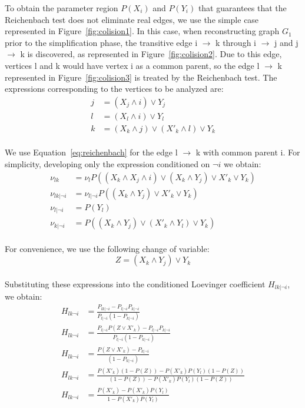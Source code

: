 \documentclass[12pt,a4paper]{report}
\begin{document}
To obtain the parameter region $P(X_i)$ and $P(Y_i)$ that guarantees that the Reichenbach test does not eliminate real edges, we use the simple case represented in Figure~\ref{fig:colision1}. In this case, when reconstructing graph $G_1$ prior to the simplification phase, the transitive edge i $ \rightarrow $ k through i $ \rightarrow $ j and j $ \rightarrow $ k is discovered, as represented in Figure~\ref{fig:colision2}. Due to this edge, vertices l and k would have vertex i as a common parent, so the edge l $ \rightarrow $ k represented in Figure~\ref{fig:colision3} is treated by the Reichenbach test. The expressions corresponding to the vertices to be analyzed are:
\begin{align*}
j &= (X_j \land i) \lor Y_j \\
l &= (X_l \land i) \lor Y_l \\
k &= (X_k \land j) \lor (X'_k \land l) \lor Y_k
\end{align*} 
\\
We use Equation~\ref{eq:reichenbach} for the edge l $ \rightarrow $ k with common parent i. For simplicity, developing only the expression conditioned on $\neg i $ we obtain:
\begin{align*}
\nu_{lk}  &= \nu_l P((X_k \land X_j \land i) \lor (X_k \land Y_j) \lor X'_k \lor Y_k) \\
\nu_{lk|\neg i}  &= \nu_{l| \neg i} P((X_k \land Y_j) \lor X'_k \lor Y_k) \\
\nu_{l| \neg i} &= P(Y_l)\\
\nu_{k| \neg i} &= P((X_k \land Y_j) \lor (X'_k \land Y_l) \lor Y_k)
\end{align*}
\\
For convenience, we use the following change of variable:
\begin{equation*}
Z = (X_k \land Y_j) \lor Y_k
\end{equation*}
\\
Substituting these expressions into the conditioned Loevinger coefficient $H_{lk| \neg i}$, we obtain:
\begin{align*}
H_{lk \neg i} &= \frac{P_{lk| \neg i} - P_{l| \neg i} P_{k| \neg i}}{P_{l| \neg i} (1 - P_{k| \neg i})} \\
H_{lk \neg i} &= \frac{P_{l| \neg i} P(Z \lor X'_k) - P_{l| \neg i} P_{k| \neg i}}{P_{l| \neg i} (1 - P_{k| \neg i})} \\
H_{lk \neg i} &= \frac{P(Z \lor X'_k) - P_{k| \neg i}}{(1 - P_{k| \neg i})} \\
H_{lk \neg i} &= \frac{P(X'_k)(1 - P(Z)) - P(X'_k)P(Y_l)(1 - P(Z))}{(1 - P(Z)) - P(X'_k)P(Y_l)(1 - P(Z))} \\
H_{lk \neg i} &= \frac{P(X'_k) - P(X'_k) P(Y_l)}{1 - P(X'_k) P(Y_l)}
\end{align*}
\end{document}
